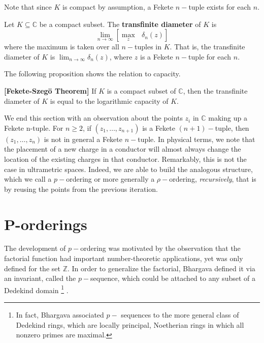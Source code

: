 Note that since $K$ is compact by assumption, a Fekete $n-$tuple exists for each $n$.\\

\begin{definition}
Let $K \subseteq \mathbb{C}$ be a compact subset. The \textbf{transfinite diameter} of $K$ is \[ \lim_{n\to\infty} [ \max_z \text{ } \delta_n(z)]\] where the maximum is taken over all $n-$tuples in $K$. That is, the transfinite diameter of $K$ is $ \lim_{n\to\infty} \delta_n(z)$, where $z$ is a Fekete $n-$tuple for each $n$.
\end{definition}

The following proposition shows the relation to capacity.\\

\begin{proposition}
\textbf{[Fekete-Szeg\"o Theorem]}\cite{fek} If $K$ is a compact subset of $\mathbb{C}$, then the transfinite diameter of $K$ is equal to the logarithmic capacity of $K$.
\end{proposition}



We end this section with an observation about the points $z_i$ in $\mathbb{C}$ making up a Fekete n-tuple. For $n \geq 2$, if $(z_1,\ldots,z_{n+1})$ is a Fekete $(n+1)-$tuple, then $(z_1,\ldots,z_n)$ is not in general a Fekete $n-$tuple. In physical terms, we note that the placement of a new charge in a conductor will almost always change the location of the existing charges in that conductor. Remarkably, this is not the case in ultrametric spaces. Indeed, we are able to build the analogous structure, which we call a $p-$ordering or more generally a $\rho-$ordering, \textit{recursively}, that is by reusing the points from the previous iteration.\\ 

\section{P-orderings}

The development of $p-$ordering was motivated by the observation that the factorial function had important number-theoretic applications, yet was only defined for the set $\mathbb{Z}$. In order to generalize the factorial, Bhargava defined it via an invariant, called the $p-$sequence, which could be attached to any subset of a Dedekind domain \footnote{In fact, Bhargava associated $p-$ sequences to the more general class of Dedekind rings, which are locally principal, Noetherian rings in which all nonzero
primes are maximal.}    \cite{mb1}.\\

